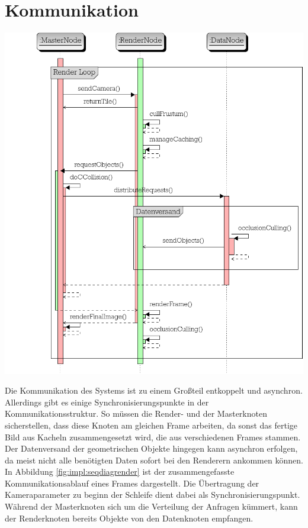\section{Kommunikation}
\label{sec:impl:kommunikation}
\begin{Bild}
\includegraphics[scale=0.85]{images/seq_diag_render.pdf}
\end{Bild}

\vspace{0.5cm}Die Kommunikation des Systems ist zu einem Großteil entkoppelt und asynchron. Allerdings gibt es einige Synchronisierungspunkte in der Kommunikationsstruktur. So müssen die Render- und der Masterknoten sicherstellen, dass diese Knoten am gleichen Frame arbeiten, da sonst das fertige Bild aus Kacheln zusammengesetzt wird, die aus verschiedenen Frames stammen. Der Datenversand der geometrischen Objekte hingegen kann asynchron erfolgen, da meist nicht alle benötigten Daten sofort bei den Renderern ankommen können. In Abbildung \ref{fig:impl:seqdiagrender} ist der zusammengefasste Kommunikationsablauf eines Frames dargestellt. Die Übertragung der Kameraparameter zu beginn der Schleife dient dabei als Synchronisierungspunkt. Während der Masterknoten sich um die Verteilung der Anfragen kümmert, kann der Renderknoten bereits Objekte von den Datenknoten empfangen.

